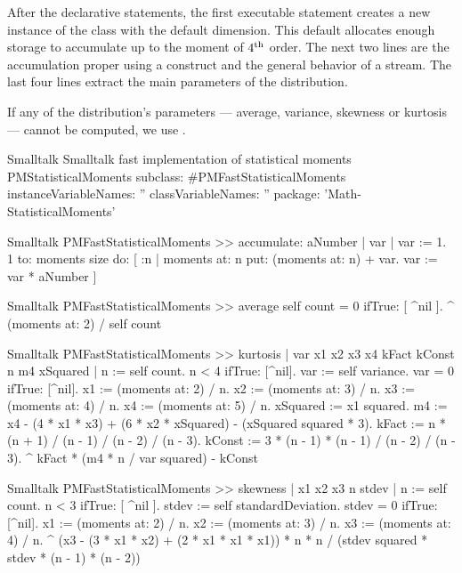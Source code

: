 After the declarative statements, the first executable statement
creates a new instance of the class  with the
default dimension.
This default allocates enough storage to accumulate up to the
moment of $4^{\mathop{\textrm{th}}}$ order.
The next two lines are the accumulation proper using a 
construct and the general behavior of a stream.
The last four lines extract the main parameters of the distribution.

If any of the distribution's parameters --- average, variance,
skewness or kurtosis --- cannot be computed, we use .

\begin{listing}[label=lst:fastmoments]{Smalltalk}
{Smalltalk fast implementation of statistical moments}
PMStatisticalMoments subclass: #PMFastStatisticalMoments
   instanceVariableNames: ''
   classVariableNames: ''
   package: 'Math-StatisticalMoments'
\end{listing}

\begin{displaycode}{Smalltalk}
PMFastStatisticalMoments >> accumulate: aNumber
    | var |
    var := 1.
    1 to: moments size
        do: 
            [ :n | 
            moments at: n put: (moments at: n) + var.
            var := var * aNumber ]
\end{displaycode}

\begin{displaycode}{Smalltalk}
PMFastStatisticalMoments >> average
    self count = 0 ifTrue: [ ^nil ].
    ^ (moments at: 2) / self count
\end{displaycode}

\begin{displaycode}{Smalltalk}
PMFastStatisticalMoments >> kurtosis
    | var x1 x2 x3 x4 kFact kConst n m4 xSquared |
    n := self count.
    n < 4 ifTrue: [^nil].
    var := self variance.
    var = 0 ifTrue: [^nil].
    x1 := (moments at: 2) / n.
    x2 := (moments at: 3) / n.
    x3 := (moments at: 4) / n.
    x4 := (moments at: 5) / n.
    xSquared := x1 squared.
    m4 := x4 - (4 * x1 * x3) + (6 * x2 * xSquared) - (xSquared 
                                                         squared * 3).
    kFact := n * (n + 1) / (n - 1) / (n - 2) / (n - 3).
    kConst := 3 * (n - 1) * (n - 1) / (n - 2) / (n - 3).
    ^ kFact * (m4 * n / var squared) - kConst
\end{displaycode}

\begin{displaycode}{Smalltalk}
PMFastStatisticalMoments >> skewness
    | x1 x2 x3 n stdev |
    n := self count.
    n < 3 ifTrue: [ ^nil ].
    stdev := self standardDeviation.
    stdev = 0 ifTrue: [^nil].
    x1 := (moments at: 2) / n.
    x2 := (moments at: 3) / n.
    x3 := (moments at: 4) / n.
    ^ (x3 - (3 * x1 * x2) + (2 * x1 * x1 * x1)) * n * n 
        / (stdev squared * stdev * (n - 1) * (n - 2))
\end{displaycode}

